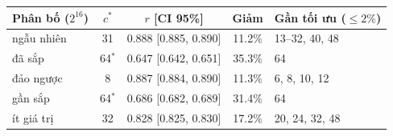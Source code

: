 \begin{tabular}{lcccl}
\toprule
Phân bố ($2^{16}$) & $c^*$ & $r$ [CI 95\%] & Giảm & Gần tối ưu ($\le2\%$) \\
\midrule
ngẫu nhiên & 31 & 0.888 [0.885, 0.890] & 11.2\% & 13--32, 40, 48 \\
đã sắp & 64$^{*}$ & 0.647 [0.642, 0.651] & 35.3\% & 64 \\
đảo ngược & 8 & 0.887 [0.884, 0.890] & 11.3\% & 6, 8, 10, 12 \\
gần sắp & 64$^{*}$ & 0.686 [0.682, 0.689] & 31.4\% & 64 \\
ít giá trị & 32 & 0.828 [0.825, 0.830] & 17.2\% & 20, 24, 32, 48 \\
\bottomrule
\end{tabular}
